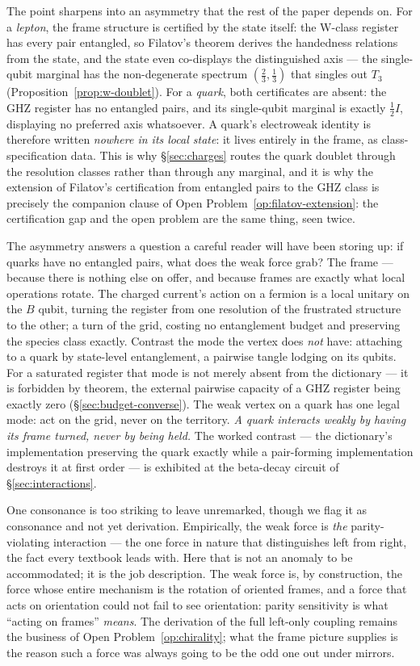 The point sharpens into an asymmetry that the rest of the paper depends on. For a \emph{lepton},
the frame structure is certified by the state itself: the W-class register has every pair
entangled, so Filatov's theorem derives the handedness relations from the state, and the state
even co-displays the distinguished axis --- the single-qubit marginal has the non-degenerate
spectrum $(\tfrac23, \tfrac13)$ that singles out $T_3$ (Proposition~\ref{prop:w-doublet}). For a
\emph{quark}, both certificates are absent: the GHZ register has no entangled pairs, and its
single-qubit marginal is exactly $\tfrac12 I$, displaying no preferred axis whatsoever. A quark's
electroweak identity is therefore written \emph{nowhere in its local state}: it lives entirely in
the frame, as class-specification data. This is why \S\ref{sec:charges} routes the quark doublet
through the resolution classes rather than through any marginal, and it is why the extension of
Filatov's certification from entangled pairs to the GHZ class is precisely the companion clause of
Open Problem~\ref{op:filatov-extension}: the certification gap and the open problem are the same
thing, seen twice.

The asymmetry answers a question a careful reader will have been storing up: if quarks have no
entangled pairs, what does the weak force grab? The frame --- because there is nothing else on
offer, and because frames are exactly what local operations rotate. The charged current's action on
a fermion is a local unitary on the $B$ qubit, turning the register from one resolution of the
frustrated structure to the other; a turn of the grid, costing no entanglement budget and
preserving the species class exactly. Contrast the mode the vertex does \emph{not} have: attaching
to a quark by state-level entanglement, a pairwise tangle lodging on its qubits. For a saturated
register that mode is not merely absent from the dictionary --- it is forbidden by theorem, the
external pairwise capacity of a GHZ register being exactly zero (\S\ref{sec:budget-converse}).
The weak vertex on a quark has one legal mode: act on the grid, never on the territory. \emph{A
quark interacts weakly by having its frame turned, never by being held.} The worked contrast ---
the dictionary's implementation preserving the quark exactly while a pair-forming implementation
destroys it at first order --- is exhibited at the beta-decay circuit of \S\ref{sec:interactions}.

One consonance is too striking to leave unremarked, though we flag it as consonance and not yet
derivation. Empirically, the weak force is \emph{the} parity-violating interaction --- the one
force in nature that distinguishes left from right, the fact every textbook leads with. Here that
is not an anomaly to be accommodated; it is the job description. The weak force is, by
construction, the force whose entire mechanism is the rotation of oriented frames, and a force that
acts on orientation could not fail to see orientation: parity sensitivity is what ``acting on
frames'' \emph{means}. The derivation of the full left-only coupling remains the business of
Open Problem~\ref{op:chirality}; what the frame picture supplies is the reason such a force was
always going to be the odd one out under mirrors.

